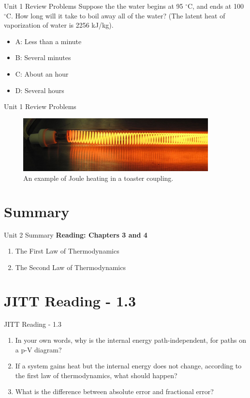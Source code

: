 \documentclass{beamer}
\begin{document}
\begin{frame}{Unit 1 Review Problems}
Suppose the the water begins at 95 $^{\circ}$C, and ends at 100 $^{\circ}$C.  How long will it take to boil away all of the water?  (The latent heat of vaporization of water is 2256 kJ/kg).
\begin{itemize}
\item A: Less than a minute
\item B: Several minutes
\item C: About an hour
\item D: Several hours
\end{itemize}
\end{frame}

\begin{frame}{Unit 1 Review Problems}
\begin{figure}
\centering
\includegraphics[width=0.9\textwidth]{figures/toaster.JPG}
\caption{\label{fig:toast} An example of Joule heating in a toaster coupling.}
\end{figure}
\end{frame}

\section{Summary}

\begin{frame}{Unit 2 Summary}
\textbf{Reading: Chapters 3 and 4}
\begin{enumerate}
\item The First Law of Thermodynamics
\item The Second Law of Thermodynamics
\end{enumerate}
\end{frame}

\section{JITT Reading -  1.3}

\begin{frame}{JITT Reading -  1.3}
\begin{enumerate}
\item In your own words, why is the internal energy path-independent, for paths on a p-V diagram?
\item If a system gains heat but the internal energy does not change, according to the first law of thermodynamics, what should happen?
\item What is the difference between absolute error and fractional error?
\end{enumerate}
\end{frame}
\end{document}
